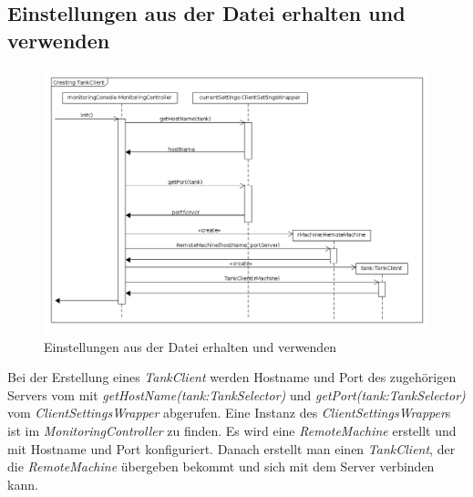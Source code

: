 \documentclass[parskip=full]{scrartcl}
\begin{document}
\subsection{Einstellungen aus der Datei erhalten und verwenden}
\begin{figure}[H]
  \centering
  \includegraphics[scale=0.4]{design/sequence-diagrams/getting-networking-settings.png}
  \caption{Einstellungen aus der Datei erhalten und verwenden}
\end{figure}
Bei der Erstellung eines \emph{TankClient} werden Hostname und Port des zugehörigen Servers vom mit \emph{getHostName(tank:TankSelector)}
und \emph{getPort(tank:TankSelector)} vom \emph{ClientSettingsWrapper} abgerufen. Eine Instanz des \emph{ClientSettingsWrapper}s
ist im \emph{MonitoringController} zu finden. Es wird eine \emph{RemoteMachine} erstellt und mit Hostname und Port konfiguriert.
Danach erstellt man einen \emph{TankClient}, der die \emph{RemoteMachine} übergeben bekommt und sich mit dem Server verbinden kann.
\end{document}
